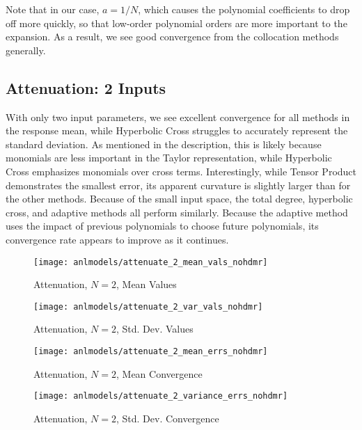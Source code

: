 Note that in our case, $a=1/N$, which causes the polynomial coefficients to drop off more quickly, so that
low-order polynomial orders are more important to the expansion.  As a result, we see good convergence from the
collocation methods generally.

\subsection{Attenuation: 2 Inputs}
With only two input parameters, we see excellent convergence for all methods in the response mean, while Hyperbolic
Cross struggles to accurately represent the standard deviation.  As mentioned in the description, this is
likely because monomials are less important in the Taylor representation, while Hyperbolic Cross emphasizes
monomials over cross terms.  Interestingly, while Tensor
Product demonstrates the smallest error, its apparent curvature is slightly larger than for the other methods.
Because of the small input space, the total degree, hyperbolic cross, and adaptive methods all perform
similarly.  Because the adaptive method uses the impact of previous polynomials to choose future polynomials,
its convergence rate appears to improve as it continues.
\begin{figure}[H]
  \centering
  \texttt{[image: anlmodels/attenuate\_2\_mean\_vals\_nohdmr]}
  \caption{Attenuation, $N=2$, Mean Values}
  \label{fig:attenuate mean values 2}
\end{figure}
\begin{figure}[H]
  \centering
  \texttt{[image: anlmodels/attenuate\_2\_var\_vals\_nohdmr]}
  \caption{Attenuation, $N=2$, Std. Dev. Values}
  \label{fig:attenuate var values 2}
\end{figure}

\begin{figure}[H]
  \centering
  \texttt{[image: anlmodels/attenuate\_2\_mean\_errs\_nohdmr]}
  \caption{Attenuation, $N=2$, Mean Convergence}
  \label{fig:attenuate mean errors 2}
\end{figure}
\begin{figure}[H]
  \centering
  \texttt{[image: anlmodels/attenuate\_2\_variance\_errs\_nohdmr]}
  \caption{Attenuation, $N=2$, Std. Dev. Convergence}
  \label{fig:attenuate var errors 2}
\end{figure}


